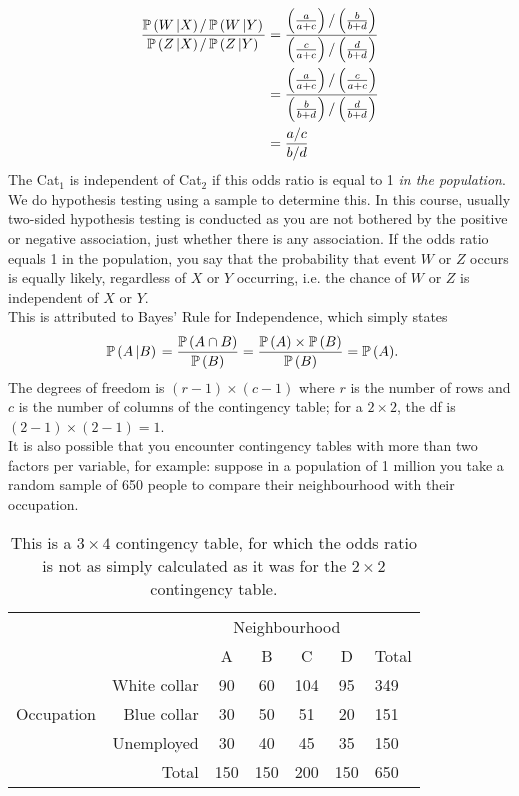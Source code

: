 \begin{align}
    \frac{\operatorname{\mathbb{P}}{\left( W \left| X \right) \right. } / \operatorname{\mathbb{P}}{\left( W \left| Y \right) \right. }}{\operatorname{\mathbb{P}}{\left( Z \left| X \right) \right. } / \operatorname{\mathbb{P}}{\left( Z \left| Y \right) \right. }} &= \dfrac{\left( \frac{a}{a+c}\right) / \left( \frac{b}{b+d}\right)}{\left( \frac{c}{a+c}\right) / \left( \frac{d}{b+d}\right)} \\
    &= \dfrac{\left( \frac{a}{a+c}\right) / \left( \frac{c}{a+c}\right)}{\left( \frac{b}{b+d}\right) / \left( \frac{d}{b+d}\right)} \\
    &= \frac{a/c}{b/d}
\end{align}
The Cat${}_1$ is independent of Cat${}_2$ if this odds ratio is equal to 1 \textit{in the population}. We do hypothesis testing using a sample to determine this. In this course, usually two-sided hypothesis testing is conducted as you are not bothered by the positive or negative association, just whether there is any association. If the odds ratio equals 1 in the population, you say that the probability that event $W$ or $Z$ occurs is equally likely, regardless of $X$ or $Y$ occurring, i.e. the chance of $W$ or $Z$ is independent of $X$ or $Y$. \\
This is attributed to Bayes' Rule for Independence, which simply states 
\begin{align}
    \operatorname{\mathbb{P}}{\left( A \left| B \right) \right. } &= \frac{\operatorname{\mathbb{P}}{\left( A \cap B\right)}}{\operatorname{\mathbb{P}}{\left( B\right)}} = \frac{\operatorname{\mathbb{P}}{\left( A\right)} \times \operatorname{\mathbb{P}}{\left( B\right)}}{\operatorname{\mathbb{P}}{\left( B\right)}} = \operatorname{\mathbb{P}}{\left( A\right)}.
\end{align}
The degrees of freedom is $(r-1)\times (c-1)$ where $r$ is the number of rows and $c$ is the number of columns of the contingency table; for a $2 \times 2$, the df is $(2-1)\times(2-1)=1$. \\
It is also possible that you encounter contingency tables with more than two factors per variable, for example: suppose in a population of 1 million you take a random sample of 650 people to compare their neighbourhood with their occupation.
\begin{table}[h]
    \centering
    \begin{tabular}{rr|cccc|l}
        {} & {} & \multicolumn{4}{c|}{Neighbourhood} & {} \\
        {} & {} & A & B & C & D & Total \\ \hline
        \multicolumn{1}{r}{\multirow{3}{*}{Occupation}} & White collar & 90 & 60 & 104 & 95 & 349 \\
        \multicolumn{1}{r}{} & Blue collar & 30 & 50 & 51 & 20 & 151 \\
        \multicolumn{1}{r}{} & Unemployed & 30 & 40 & 45 & 35 & 150 \\ \hline
        {} & Total & 150 & 150 & 200 & 150 & 650
    \end{tabular}
    \caption{This is a $3 \times 4$ contingency table, for which the odds ratio is not as simply calculated as it was for the $2 \times 2$ contingency table.}
    \label{tab:2wk6}
\end{table}
